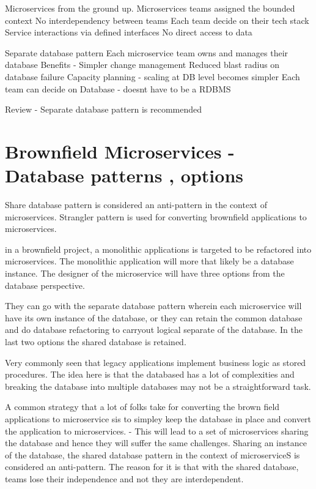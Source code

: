 \documentclass[a4paper, 11pt]{book}
\begin{document}
    Microservices from the ground up.
    Microservices teams assigned the bounded context
    No interdependency between teams
    Each team decide on their tech stack
    Service interactions via defined interfaces
    No direct access to data

    Separate database pattern
    Each microservice team owns and manages their database
    Benefits - Simpler change management
    Reduced blast radius on database failure
    Capacity planning - scaling at DB level becomes simpler
    Each team can decide on Database - doesnt have to be a RDBMS

    Review
    - Separate database pattern is recommended


    \section{Brownfield Microservices - Database patterns , options}
    Share database pattern is considered an anti-pattern in the context of microservices.
    Strangler pattern is used for converting brownfield applications to microservices.

    in a brownfield project, a monolithic applications is targeted to be refactored into microservices.
    The monolithic application will more that likely be a database instance.
    The designer of the microservice will have three options from the database perspective.

    They can go with the separate database pattern wherein each microservice will have its own instance of the database, or they can retain the common database and do database refactoring to carryout logical separate of the database.
    In the last two options the shared database is retained.

    Very commonly seen that legacy applications implement business logic as stored procedures.
    The idea here is that the databased has a lot of complexities and breaking the database into multiple databases may not be a straightforward task.

    A common strategy that a lot of folks take for converting the brown field applications to microservice sis to simpley keep the database in place and convert the application to microservices.
    - This will lead to a set of microservices sharing the database and hence they will suffer the same challenges.
    Sharing an instance of the database, the shared database pattern in the context of microserviceS is considered an anti-pattern.
    The reason for it is that with the shared database, teams lose their independence and not they are interdependent.
\end{document}
